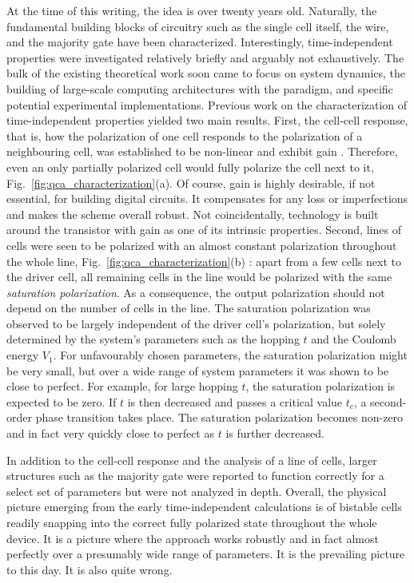 At the time of this writing, the  idea is over twenty years old.
Naturally, the fundamental building blocks of  circuitry such as the
single cell itself, the wire, and the majority gate have been characterized.
Interestingly, time-independent properties were investigated relatively briefly
and arguably not exhaustively. The bulk of the existing theoretical work soon
came to focus on system dynamics, the building of large-scale computing
architectures with the  paradigm, and specific potential experimental
implementations. Previous work on the characterization of time-independent
 properties yielded two main results. First, the cell-cell response,
that is, how the polarization of one cell responds to the polarization of a
neighbouring cell, was established to be non-linear and exhibit gain
\cite{lent1993quantum}. Therefore, even an only partially polarized cell would
fully polarize the cell next to it, Fig.~\ref{fig:qca_characterization}(a). Of
course, gain is highly desirable, if not essential, for building digital
circuits. It compensates for any loss or imperfections and makes the scheme
overall robust. Not coincidentally,  technology is built around the
 transistor with gain as one of its intrinsic properties. Second,
lines of cells were seen to be polarized with an almost constant polarization
throughout the whole line, Fig.~\ref{fig:qca_characterization}(b)
\cite{lent1993lines}: apart from a few cells next to the driver cell, all
remaining cells in the line would be polarized with the same \emph{saturation
polarization}. As a consequence, the output polarization should not depend on
the number of cells in the line. The saturation polarization was observed to be
largely independent of the driver cell's polarization, but solely determined by
the system's parameters such as the hopping $t$ and the Coulomb energy $V_1$.
For unfavourably chosen parameters, the saturation polarization might be very
small, but over a wide range of system parameters it was shown to be close to
perfect. For example, for large hopping $t$, the saturation polarization is
expected to be zero. If $t$ is then decreased and passes a critical value $t_c$,
a second-order phase transition takes place. The saturation polarization becomes
non-zero and in fact very quickly close to perfect as $t$ is further decreased. 

%
In addition to the cell-cell response and the analysis of a line of cells,
larger  structures such as the majority gate were reported to function
correctly for a select set of parameters but were not analyzed in depth.
Overall, the physical picture emerging from the early time-independent
calculations is of bistable cells readily snapping into the correct fully
polarized state throughout the whole device. It is a picture where the
 approach works robustly and in fact almost perfectly over a
presumably wide range of parameters. It is the prevailing picture to this day.
It is also quite wrong.

